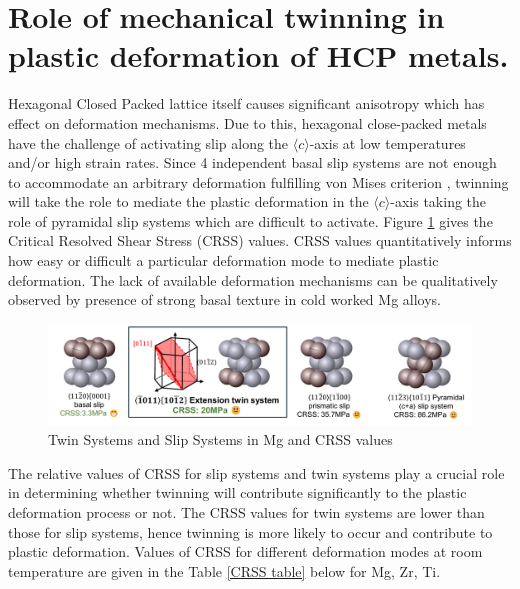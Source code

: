 \section{Role of mechanical twinning in plastic deformation of HCP metals.}
Hexagonal Closed Packed lattice itself causes significant anisotropy which has effect on deformation mechanisms. Due to this, hexagonal close-packed metals have the challenge of activating slip along the $\langle c \rangle$-axis at low temperatures and/or high strain rates. Since 4 independent basal slip systems are not enough to accommodate an arbitrary deformation fulfilling von Mises criterion \cite{taylor1938plastic}, twinning will take the role to mediate the plastic deformation in the $\langle c \rangle$-axis taking the role of pyramidal slip systems which are difficult to activate.
Figure \ref{Twin_slip_MG_CRSS} gives the Critical Resolved Shear Stress (CRSS) values. CRSS values quantitatively informs how easy or difficult a particular deformation mode to mediate plastic deformation. The lack of available deformation mechanisms can be qualitatively observed by presence of strong basal texture \cite{Yoo1981409} in cold worked Mg alloys. 
\begin{figure}[H]
    \centering
    \includegraphics[width=\textwidth]{images/Mg_Deformation_systems_CRSS.pdf}
    \caption{Twin Systems and Slip Systems in Mg and CRSS values}
    \label{Twin_slip_MG_CRSS}
\end{figure}
The relative values of CRSS for slip systems and twin systems play a crucial role in determining whether twinning will contribute significantly to the plastic deformation process or not. The CRSS values for twin systems are lower than those for slip systems, hence twinning is more likely to occur and contribute to plastic deformation. Values of CRSS for different deformation modes at room temperature are given in the Table \ref{CRSS table} \cite{ARULKUMAR2016143} below for Mg\cite{Kelly19685}\cite{BEYERLEIN2011988}, Zr\cite{Knezevic201555}, Ti\cite{QIN2014293}.

